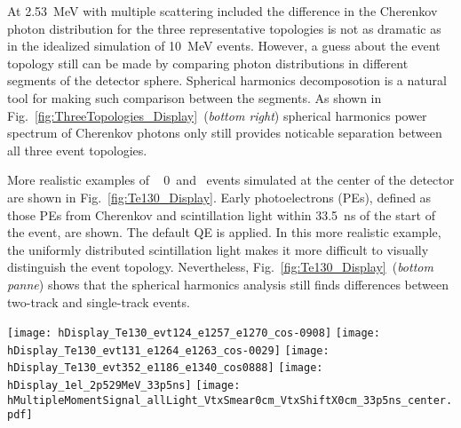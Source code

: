 At 2.53~MeV with multiple scattering included the difference in the Cherenkov photon distribution for the three representative topologies 
is not as dramatic as in the idealized simulation of 10~MeV events. However, a guess about the event topology still can be made by comparing 
photon distributions in different segments of the detector sphere. Spherical harmonics decomposotion is a natural tool for making such 
comparison between the segments. As shown in Fig.~\ref{fig:ThreeTopologies_Display}~(\emph{bottom right}) spherical harmonics power spectrum 
of Cherenkov photons only still provides noticable separation between all three event topologies.

More realistic examples of \Te~ 0\nbb~and \B~events simulated at the center of the detector are shown in Fig.~\ref{fig:Te130_Display}. 
Early photoelectrons (PEs), defined as those PEs from Cherenkov and scintillation light within 33.5~ns of the start of the event, are shown. 
The default QE is applied.  In this more realistic example, the uniformly distributed scintillation light makes it more difficult to 
visually distinguish the event topology. Nevertheless, Fig.~\ref{fig:Te130_Display}~(\emph{bottom panne}) shows that the spherical harmonics
analysis still finds differences between two-track and single-track events.

\begin{figure*}[h]
  \centering
  \texttt{[image: hDisplay\_Te130\_evt124\_e1257\_e1270\_cos-0908]}
  \texttt{[image: hDisplay\_Te130\_evt131\_e1264\_e1263\_cos-0029]}
  \texttt{[image: hDisplay\_Te130\_evt352\_e1186\_e1340\_cos0888]}
  \texttt{[image: hDisplay\_1el\_2p529MeV\_33p5ns]}
  \texttt{[image: hMultipleMomentSignal\_allLight\_VtxSmear0cm\_VtxShiftX0cm\_33p5ns\_center.pdf]} 
  \caption{ (\emph{Top and middle rows:} Event display examples for {\Te} 0{\nbb}-decay signal and {\B} background events.
    The default QE and the time cut of 33.5~ns are now applied to cherenkov (\emph{triangles} and scintillation (\emph{crosses}) 
    photons. For the {\Te} 0{\nbb}-decay signal three representative events are shown each closely matching on of the three
    topologies. A typical single electron event is shown for the {\B} background.
    \emph{Top left:} $^{130}$Te 0{\nbb}-decay back-to-back electrons: $E_1$=1.257~MeV, $E_2$=1.270~MeV, 
    cos($\theta$)=-0.908. \emph{Top right:} $^{130}$Te 0{\nbb}-decay electrons at $\sim$90$^{\circ}$: $E_1$=1.264~MeV, $E_2$=1.263~MeV,
    cos($\theta$)=-0.029. \emph{Middle left:} $^{130}$Te 0{\nbb}-decay electrons at $\sim$0$^{\circ}$: $E_1$=1.186~MeV, $E_2$=1.340~MeV,
    cos($\theta$)=0.888. \emph{Middle right:} 2.529~MeV single electron. In all events electrons originate at the center of the detector.
    \emph{Bottom pannel:} Normalized power spectrum $S_l$ calculated for distribution of all PE after the 33.5~ns time cut. 
    {\Te} 0{\nbb}-decay signal (\emph{solid red line}) and {\B} background (\emph{dashed blue line}) topologies are compared.}
\label{fig:Te130_Display}
\end{figure*}


